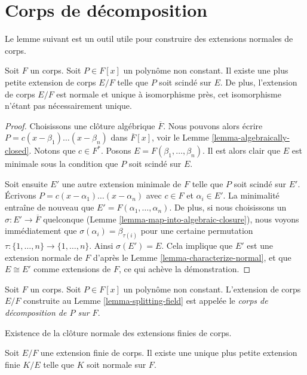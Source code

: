 \section{Corps de décomposition}
\label{section-splitting-fieds}

\noindent
Le lemme suivant est un outil utile pour construire des extensions normales de corps.

\begin{lemma}
\label{lemma-splitting-field}
Soit $F$ un corps. Soit $P \in F[x]$ un polynôme non constant.
Il existe une plus petite extension de corps $E/F$ telle que $P$
soit scindé sur $E$. De plus, l'extension de corps $E/F$ est normale
et unique à isomorphisme près, cet isomorphisme n'étant pas nécessairement unique.
\end{lemma}

\begin{proof}
Choisissons une clôture algébrique $\overline{F}$. Nous pouvons alors écrire
$P = c (x - \beta_1) \ldots (x - \beta_n)$ dans $\overline{F}[x]$, voir le
Lemme \ref{lemma-algebraically-closed}. Notons que $c \in F^*$. Posons
$E = F(\beta_1, \ldots, \beta_n)$. Il est alors clair que $E$ est
minimale sous la condition que $P$ soit scindé sur $E$.

\medskip\noindent
Soit ensuite $E'$ une autre extension minimale de $F$ telle que
$P$ soit scindé sur $E'$. Écrivons
$P = c (x - \alpha_1) \ldots (x - \alpha_n)$ avec $c \in F$ et
$\alpha_i \in E'$. La minimalité entraîne de nouveau que
$E' = F(\alpha_1, \ldots, \alpha_n)$. De plus, si nous choisissons
un $\sigma : E' \to \overline{F}$ quelconque
(Lemme \ref{lemma-map-into-algebraic-closure}),
nous voyons immédiatement que $\sigma(\alpha_i) = \beta_{\tau(i)}$
pour une certaine permutation $\tau : \{1, \ldots, n\} \to \{1, \ldots, n\}$.
Ainsi $\sigma(E') = E$. Cela implique que $E'$ est une extension normale
de $F$ d'après le Lemme \ref{lemma-characterize-normal},
et que $E \cong E'$ comme extensions de $F$, ce qui achève la démonstration.
\end{proof}

\begin{definition}
\label{definition-splitting-field}
Soit $F$ un corps. Soit $P \in F[x]$ un polynôme non constant.
L'extension de corps $E/F$ construite au Lemme \ref{lemma-splitting-field}
est appelée le {\it corps de décomposition de $P$ sur $F$}.
\end{definition}

\begin{lemma}
\label{lemma-normal-closure}
\begin{slogan}
Existence de la clôture normale des extensions finies de corps.
\end{slogan}
Soit $E/F$ une extension finie de corps. Il existe une unique
plus petite extension finie $K/E$ telle que $K$ soit normale sur $F$.
\end{lemma}

